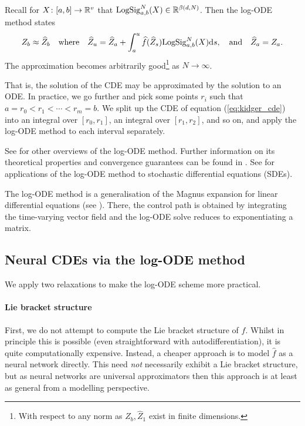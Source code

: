 Recall for $X \colon [a, b] \to \mathbb{R}^v$ that $\mathrm{LogSig}^N_{a, b}(X) \in \mathbb{R}^{\beta(d, N)}$. Then the log-ODE method states
\begin{equation}
    Z_b \approx \widehat{Z}_b \quad \text{where} \quad \widehat{Z}_u = \widehat{Z}_a + \int^{u}_{a} \widehat{f}(\widehat{Z}_s) \mathrm{LogSig}^N_{a, b}(X)\mathrm{d} s, \quad \text{and} \quad  \widehat{Z}_{a} = Z_{a}.
    \label{eq:log-ode}
\end{equation}
The approximation becomes arbitrarily good\footnote{With respect to any norm as $Z_b, \widehat{Z}_1$ exist in finite dimensions.} as $N \to \infty$.

That is, the solution of the CDE may be approximated by the solution to an ODE. In practice, we go further and pick some points $r_i$ such that $a = r_0 < r_1 < \cdots < r_m = b$. We split up the CDE of equation (\ref{eq:kidger_cde}) into an integral over $[r_0, r_1]$, an integral over $[r_1, r_2]$, and so on, and apply the log-ODE method to each interval separately.

See \citet{janssen2012thesis, lyons2014streams} for other overviews of the log-ODE method. Further information on its theoretical properties and convergence guarantees can be found in \citet{logode2014estimate}. See \citet{gyurko2008logode, flint2015logode, foster2020poly} for applications of the log-ODE method to stochastic differential equations (SDEs).

The log-ODE method is a generalisation of the Magnus expansion for linear differential equations (see \citet{magnus2008expansion}). There, the control path is obtained by integrating the time-varying vector field and the log-ODE solve reduces to exponentiating a matrix.

\subsection{Neural CDEs via the log-ODE method}

We apply two relaxations to make the log-ODE scheme more practical.

\paragraph{Lie bracket structure} First, we do not attempt to compute the Lie bracket structure of $\widehat{f}$. Whilst in principle this is possible (even straightforward with autodifferentiation), it is quite computationally expensive. Instead, a cheaper approach is to model $\widehat{f}$ as a neural network directly. This need \emph{not} necessarily exhibit a Lie bracket structure, but as neural networks are universal approximators \citep{pinkus, deepandnarrow} then this approach is at least as general from a modelling perspective.

